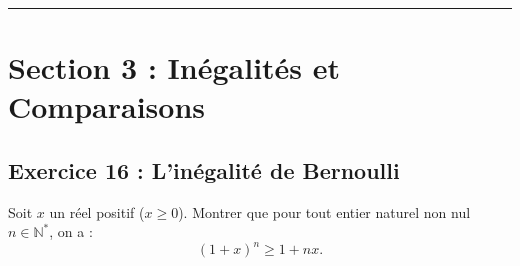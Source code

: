 \documentclass[11pt,a4paper]{article}
\newcommand{\N}{\mathbb{N}}
\begin{document}
\vspace{1cm}
\hrule
\vspace{1cm}
\section{Section 3 : Inégalités et Comparaisons}

\subsection*{Exercice 16 : L'inégalité de Bernoulli}

Soit $x$ un réel positif ($x \ge 0$). Montrer que pour tout entier naturel non nul $n \in \N^*$, on a :
\[
(1+x)^n \ge 1 + nx.
\]
\end{document}
